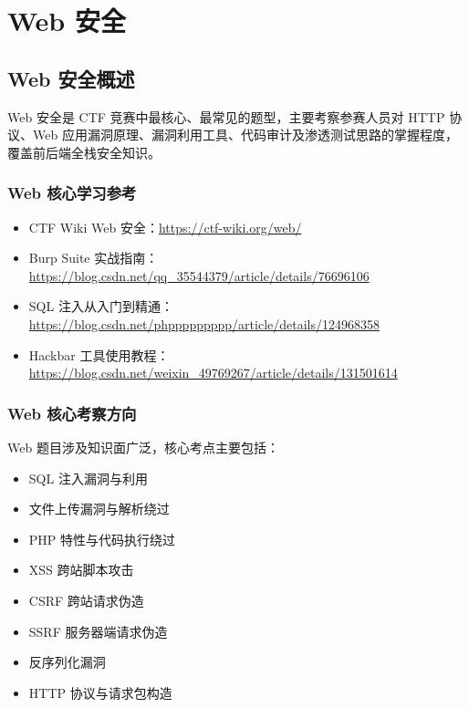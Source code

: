 \section{Web 安全}
\label{sec:web}

\subsection{Web 安全概述}
Web 安全是 CTF 竞赛中最核心、最常见的题型，主要考察参赛人员对 HTTP 协议、Web 应用漏洞原理、漏洞利用工具、代码审计及渗透测试思路的掌握程度，覆盖前后端全栈安全知识。

\subsubsection{Web 核心学习参考}
\begin{itemize}[leftmargin=*]
    \item CTF Wiki Web 安全：\url{https://ctf-wiki.org/web/}
    \item Burp Suite 实战指南：\url{https://blog.csdn.net/qq_35544379/article/details/76696106}
    \item SQL 注入从入门到精通：\url{https://blog.csdn.net/phppppppppp/article/details/124968358}
    \item Hackbar 工具使用教程：\url{https://blog.csdn.net/weixin_49769267/article/details/131501614}
\end{itemize}

\subsubsection{Web 核心考察方向}
Web 题目涉及知识面广泛，核心考点主要包括：
\begin{itemize}[leftmargin=*]
    \item SQL 注入漏洞与利用
    \item 文件上传漏洞与解析绕过
    \item PHP 特性与代码执行绕过
    \item XSS 跨站脚本攻击
    \item CSRF 跨站请求伪造
    \item SSRF 服务器端请求伪造
    \item 反序列化漏洞
    \item HTTP 协议与请求包构造
\end{itemize}

\newpage
